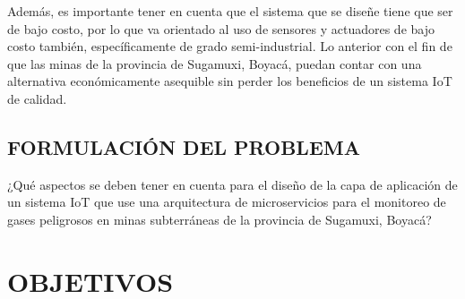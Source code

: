 \documentclass[stu,12pt,floatsintext]{apa7}
\begin{document}
	Además, es importante tener en cuenta que el sistema que se diseñe tiene que ser de bajo costo, por lo que va orientado al uso de sensores y actuadores de bajo costo también, específicamente de grado semi-industrial. Lo anterior con el fin de que las minas de la provincia de Sugamuxi, Boyacá, puedan contar con una alternativa económicamente asequible sin perder los beneficios de un sistema IoT de calidad.
	\subsection{FORMULACIÓN DEL PROBLEMA}
	¿Qué aspectos se deben tener en cuenta para el diseño de la capa de aplicación de un sistema IoT que use una arquitectura de microservicios para el monitoreo de gases peligrosos en minas subterráneas de la provincia de Sugamuxi, Boyacá?
	
	\section{OBJETIVOS}
\end{document}
